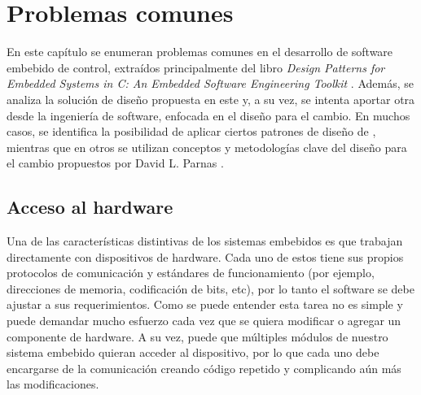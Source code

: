 

%
%
\chapter{Problemas comunes}
\label{problemasComunes}

En este capítulo se enumeran problemas comunes en el desarrollo de software embebido de control, extraídos principalmente del libro \textit{Design Patterns for Embedded Systems in C: An Embedded Software Engineering Toolkit} \cite{douglass}. Además, se analiza la solución de diseño propuesta en este y, a su vez, se intenta aportar otra desde la ingeniería de software, enfocada en el diseño para el cambio. En muchos casos, se identifica la posibilidad de aplicar ciertos patrones de diseño de \cite{Gamma:1995:DPE:186897}, mientras que en otros se utilizan conceptos y metodologías clave del diseño para el cambio propuestos por David L. Parnas \cite{Parnas02,Parnas1972,parnas1977abstract}.


\minitoc



\section{Acceso al hardware}
\label{Accesoalhardware}
Una de las características distintivas de los sistemas embebidos es que trabajan directamente con dispositivos de hardware. Cada uno de estos tiene sus propios protocolos de comunicación y estándares de funcionamiento (por ejemplo, direcciones de memoria, codificación de bits, etc), por lo tanto el software se debe ajustar a sus requerimientos. Como se puede entender esta tarea no es simple y puede demandar mucho esfuerzo cada vez que se quiera modificar o agregar un componente de hardware. A su vez, puede que múltiples módulos de nuestro sistema embebido quieran acceder al dispositivo, por lo que cada uno debe encargarse de la comunicación creando código repetido y complicando aún más las modificaciones. 

